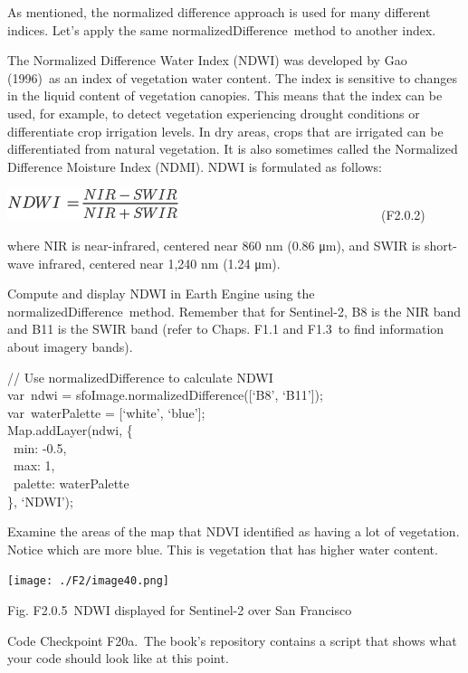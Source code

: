 \documentclass[
  letterpaper,
  DIV=11,
  numbers=noendperiod]{scrreprt}
\begin{document}
As mentioned, the normalized difference approach is used for many
different indices. Let's apply the same normalizedDifference~method to
another index.

The Normalized Difference Water Index (NDWI) was developed by Gao
(1996)~as an index of vegetation water content. The index is sensitive
to changes in the liquid content of vegetation canopies. This means that
the index can be used, for example, to detect vegetation experiencing
drought conditions or differentiate crop irrigation levels. In dry
areas, crops that are irrigated can be differentiated from natural
vegetation. It is also sometimes called the Normalized Difference
Moisture Index (NDMI). NDWI is formulated as follows:

\includegraphics{./F2/image2.png}~~~~~~~~~~~~~~~~~~~~~~~~~~~~~~~~(F2.0.2)

where NIR is near-infrared, centered near 860 nm (0.86 μm), and SWIR is
short-wave infrared, centered near 1,240 nm (1.24 μm).

Compute and display NDWI in Earth Engine using the
normalizedDifference~method. Remember that for Sentinel-2, B8 is the NIR
band and B11 is the SWIR band (refer to Chaps. F1.1 and F1.3~to find
information about imagery bands).

// Use normalizedDifference to calculate NDWI\\
var~ndwi = sfoImage.normalizedDifference({[}`B8', `B11'{]});\\
var~waterPalette = {[}`white', `blue'{]};\\
Map.addLayer(ndwi, \{\\
\hspace*{0.333em} ~min: -0.5,\\
\hspace*{0.333em} ~max: 1,\\
\hspace*{0.333em} ~palette: waterPalette\\
\}, `NDWI');

Examine the areas of the map that NDVI identified as having a lot of
vegetation. Notice which are more blue. This is vegetation that has
higher water content.

\texttt{[image: ./F2/image40.png]}

Fig. F2.0.5~NDWI displayed for Sentinel-2 over San Francisco

\begin{tcolorbox}[enhanced jigsaw, left=2mm, breakable, rightrule=.15mm, opacityback=0, colframe=quarto-callout-note-color-frame, colbacktitle=quarto-callout-note-color!10!white, arc=.35mm, opacitybacktitle=0.6, toptitle=1mm, colback=white, leftrule=.75mm, title=\textcolor{quarto-callout-note-color}{\faInfo}\hspace{0.5em}{Note}, toprule=.15mm, bottomtitle=1mm, titlerule=0mm, bottomrule=.15mm, coltitle=black]

Code Checkpoint F20a.~The book's repository contains a script that shows
what your code should look like at this point.~

\end{tcolorbox}
\end{document}

